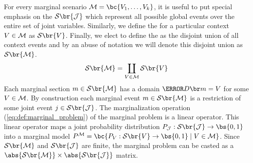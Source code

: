 \documentclass[aps, 10pt, english, twoside, pra, nofootinbib, tightenlines, longbibliography, superscriptaddress]{revtex4-1}
\renewcommand{\Events}[1]{\mathcal{S}\br{#1}} %
\begin{document}
    For every marginal scenario $\mscenario = \bc{V_1, \ldots, V_k}$, it is useful to put special emphasis on the  $\Events{\jointvar}$ which represent all possible global events over the entire set of joint variables. Similarly, we define the  for a particular context $V \in \mathcal{M}$ as $\Events{V}$. Finally, we elect to define the  as the disjoint union of all context events and by an abuse of notation we will denote this disjoint union as $\Events{\mscenario}$.
    \[ \Events{\mscenario} = \coprod_{V \in \mscenario} \Events{V} \]
    Each marginal section $m \in \Events{\mscenario}$ has a domain $\Dom{m} = V$ for some $V \in \mathcal{M}$. By construction each marginal event $m \in \Events{\mscenario}$ is a restriction of some joint event $j \in \Events{\jointvar}$.
    The marginalization operation (\cref{eq:def:marginal_problem}) of the marginal problem is a linear operator. This linear operator maps a joint probability distribution $\prob[\jointvar] : \Events{\jointvar} \to \bs{0,1}$ into a marginal model $\prob^{\mscenario} = \bc{\prob[V] : \Events{V} \to \bs{0,1} \mid V \in \mscenario}$. Since $\Events{\mscenario}$ and $\Events{\jointvar}$ are finite, the marginal problem can be casted as a $\abs{\Events{\mscenario}} \times \abs{\Events{\jointvar}}$ matrix.
\end{document}
